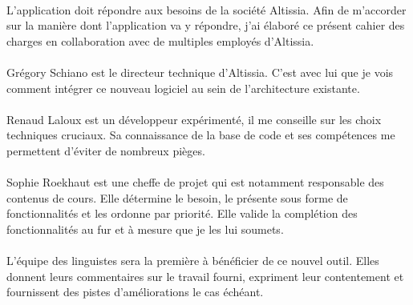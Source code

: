 \paragraph{}
L'application doit répondre aux besoins de la société Altissia.
Afin de m'accorder sur la manière dont l'application va y répondre, j'ai élaboré ce présent cahier des charges en collaboration avec de multiples employés d'Altissia.

\paragraph{}
Grégory Schiano est le directeur technique d'Altissia.
C'est avec lui que je vois comment intégrer ce nouveau logiciel au sein de l'architecture existante.

\paragraph{}
Renaud Laloux est un développeur expérimenté, il me conseille sur les choix techniques cruciaux.
Sa connaissance de la base de code et ses compétences me permettent d'éviter de nombreux pièges.

\paragraph{}
Sophie Roekhaut est une cheffe de projet qui est notamment responsable des contenus de cours.
Elle détermine le besoin, le présente sous forme de fonctionnalités et les ordonne par priorité.
Elle valide la complétion des fonctionnalités au fur et à mesure que je les lui soumets.

\paragraph{}
L'équipe des linguistes sera la première à bénéficier de ce nouvel outil.
Elles donnent leurs commentaires sur le travail fourni, expriment leur contentement et fournissent des pistes d'améliorations le cas échéant.
